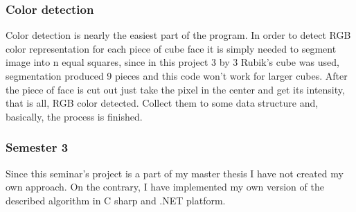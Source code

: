 \documentclass[../../main.tex]{subfiles}
\begin{document}
\subsubsection{Color detection}

Color detection is nearly the easiest part of the program. In order to detect RGB color representation for each piece of cube face it is simply needed to segment image into n equal squares, since in this project 3 by 3 Rubik’s cube was used, segmentation produced 9 pieces and this code won’t work for larger cubes.
After the piece of face is cut out just take the pixel in the center and get its intensity, that is all, RGB color detected. Collect them to some data structure and, basically, the process is finished.



\subsubsection{Semester 3}
Since this seminar’s project is a part of my master thesis I have not created my own approach. On the contrary, I have implemented my own version of the described algorithm in C sharp and .NET platform.

\end{document}
